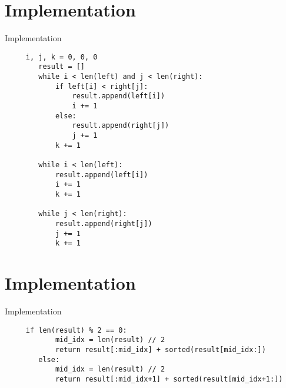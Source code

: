 \documentclass[10pt]{beamer}
\begin{document}
\section{Implementation}
\begin{frame}[fragile]{Implementation}
\begin{tcolorbox}[colback=blue!5,colframe=blue!40!black,title=Merging of the two subaarays]
\scriptsize \begin{verbatim}
     i, j, k = 0, 0, 0
        result = []
        while i < len(left) and j < len(right):
            if left[i] < right[j]:
                result.append(left[i])
                i += 1
            else:
                result.append(right[j])
                j += 1
            k += 1
        
        while i < len(left):
            result.append(left[i])
            i += 1
            k += 1
        
        while j < len(right):
            result.append(right[j])
            j += 1
            k += 1
\end{verbatim}
\end{tcolorbox}
\end{frame}

\section{Implementation}
\begin{frame}[fragile]{Implementation}
\begin{tcolorbox}[colback=blue!5,colframe=blue!40!black,title=Sorting of the merged result array]
\footnotesize \begin{verbatim}
     if len(result) % 2 == 0:
            mid_idx = len(result) // 2
            return result[:mid_idx] + sorted(result[mid_idx:])
        else:
            mid_idx = len(result) // 2
            return result[:mid_idx+1] + sorted(result[mid_idx+1:])
\end{verbatim}
\end{tcolorbox}
\end{frame}
\end{document}
